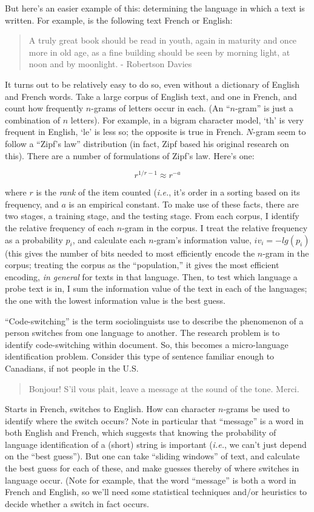 \documentclass[11pt]{article}
\begin{document}
{But here's an easier example of this: determining the language in which a text is written. For example, is the following text French or English:

\begin{quotation}
A truly great book should be read in youth, again in maturity and once more in old age, as a fine building should be seen by morning light, at noon and by moonlight. - Robertson Davies
\end{quotation}

It turns out to be relatively easy to do so, even without a dictionary of English and French words. Take a large corpus of English text, and one in French, and count how frequently $n$-grams of letters occur in each. (An ``$n$-gram'' is just a combination of $n$ letters). For example, in a bigram character model, `th' is very frequent in English, `le' is less so; the opposite is true in French. $N$-gram seem to follow a ``Zipf's law'' distribution (in fact, Zipf based his original research on this).  There are a number of formulations of Zipf's law. Here's one: 

$$r^{1/{r-1}} \approx r^{-a} $$

where $r$ is the \textit{rank} of the item counted (\textit{i.e.}, it's order in a sorting based on its frequency, and $a$ is an empirical constant. To make use of these facts, there are two stages, a training stage, and the testing stage. From each corpus, I identify the relative frequency of each $n$-gram in the corpus. I treat the relative frequency as a probability $p_i$, and calculate each $n$-gram's information value, $iv_i = -lg(p_i)$ (this gives the number of bits needed to most efficiently encode the $n$-gram in the corpus; treating the corpus as the ``population,'' it gives the most efficient encoding, \textit{in general} for texts in that language. Then, to test which language a probe text is in, I sum the information value of the text in each of the languages; the one with the lowest information value is the best guess.  

``Code-switching'' is the term sociolinguists use to describe the phenomenon of a person switches from one language to another. The research problem is to identify code-switching within document. So, this becomes a micro-language identification problem. Consider this type of sentence familiar enough to Canadians, if not people in the U.S. \begin{quotation}
Bonjour! S'il vous plait, leave a message at the sound of the tone. Merci. \end{quotation} Starts in French, switches to English. How can character $n$-grams be used to identify where the switch occurs? Note in particular that ``message'' is a word in both English and French, which suggests that knowing the probability of language identification of a (short) string is important (\textit{i.e.}, we can't just depend on the ``best guess''). But one can take ``sliding windows'' of text, and calculate the best guess for each of these, and make guesses thereby of where switches in language occur. (Note for example, that the word ``message'' is both a word in French and English, so we'll need some statistical techniques and/or heuristics to decide whether a switch in fact occurs.

}
\end{document}
